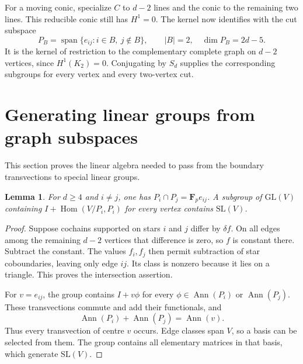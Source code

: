\documentclass[11pt]{article}
\newtheorem{lemma}[theorem]{Lemma}
\begin{document}
For a moving conic, specialize $C$ to $d-2$ lines and the conic to the remaining two lines. This reducible conic still has $H^1=0$. The kernel now identifies with the cut subspace
\[
 P_B=\operatorname{span}\{e_{ij}:i\in B,\ j\notin B\},\qquad
 |B|=2,\quad \dim P_B=2d-5.
\]
It is the kernel of restriction to the complementary complete graph on $d-2$ vertices, since $H^1(K_2)=0$. Conjugating by $S_d$ supplies the corresponding subgroups for every vertex and every two-vertex cut.

\section{Generating linear groups from graph subspaces}\label{sec:plane-graph}
This section proves the linear algebra needed to pass from the boundary transvections to special linear groups.

\begin{lemma}\label{lem:plane-stars}
For $d\ge4$ and $i\ne j$, one has $P_i\cap P_j=\mathbf F_p e_{ij}$. A subgroup of $\mathrm{GL}(V)$ containing $I+\operatorname{Hom}(V/P_i,P_i)$ for every vertex contains $\mathrm{SL}(V)$.
\end{lemma}
\begin{proof}
Suppose cochains supported on stars $i$ and $j$ differ by $\delta f$. On all edges among the remaining $d-2$ vertices that difference is zero, so $f$ is constant there. Subtract the constant. The values $f_i,f_j$ then permit subtraction of star coboundaries, leaving only edge $ij$. Its class is nonzero because it lies on a triangle. This proves the intersection assertion.

For $v=e_{ij}$, the group contains $I+v\phi$ for every $\phi\in\operatorname{Ann}(P_i)$ or $\operatorname{Ann}(P_j)$. These transvections commute and add their functionals, and
\[
 \operatorname{Ann}(P_i)+\operatorname{Ann}(P_j)=\operatorname{Ann}(v).
\]
Thus every transvection of centre $v$ occurs. Edge classes span $V$, so a basis can be selected from them. The group contains all elementary matrices in that basis, which generate $\mathrm{SL}(V)$.
\end{proof}
\end{document}
